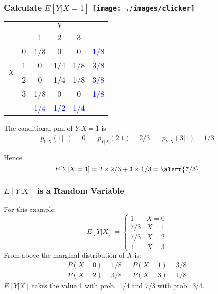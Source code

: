 \begin{frame}
	\frametitle{Calculate $E[Y|X=1]$ \hfill \texttt{[image: ./images/clicker]}}

\footnotesize
\begin{table}
\begin{tabular}{|cc|ccc|c|}
\hline
&&\multicolumn{3}{c|}{$Y$}&\\
&&1 & 2&3&\\
\hline
\multirow{4}{*}{$X$}
&0& \multicolumn{1}{|c}{\alert{1/8}} & \alert{0}& \alert{0}&\textcolor{blue}{1/8}\\
&1& \multicolumn{1}{|c}{\alert{0}} & \alert{1/4}&\alert{1/8}&\textcolor{blue}{3/8}\\
&2& \multicolumn{1}{|c}{\alert{0}} & \alert{1/4}&\alert{1/8}&\textcolor{blue}{3/8}\\
&3& \multicolumn{1}{|c}{\alert{1/8}} & \alert{0}&\alert{0}&\textcolor{blue}{1/8}\\
\hline
&&\textcolor{blue}{1/4}&\textcolor{blue}{1/2}&\textcolor{blue}{1/4}&\\
\hline
\end{tabular}
\end{table}
\pause
The conditional pmf of $Y|X=1$ is
	$$\boxed{\begin{array}{ccc}p_{Y|X}(1|1) =0 \quad&p_{Y|X}(2|1) =2/3 \quad&p_{Y|X}(3|1) =1/3\end{array}}$$
	

Hence
	$$E[Y|X=1] = 2 \times 2/3 + 3 \times 1/3 = \alert{7/3}$$

\end{frame}
\begin{frame}
\frametitle{$E[Y|X]$ is a Random Variable}
For this example:
	$$E[Y|X]= \left\{\begin{array}{cc}  
	1& X = 0\\
	7/3& X = 1\\
	7/3& X = 2\\ 
	1& X = 3 
	\end{array}\right.$$ 
From above the marginal distribution of $X$ is:
	\begin{eqnarray*}
		P(X=0)= 1/8 && P(X=1) = 3/8\\
		P(X=2)=3/8 && P(X=3)=1/8
	\end{eqnarray*} 
\alert{$E[Y|X]$ takes the value 1 with prob.\ 1/4 and 7/3 with prob.\ 3/4.}

\end{frame}
